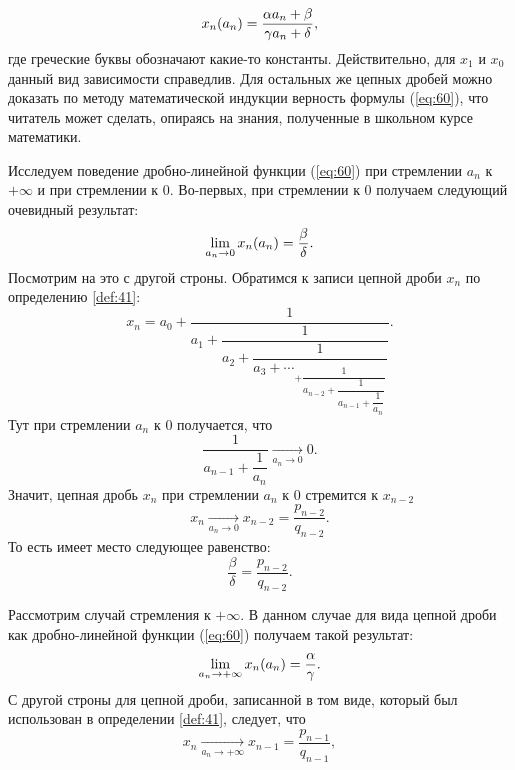 \documentclass[12pt]{article}
\begin{document}
\begin{equation}\label{eq:60}
    x_n\qty(a_n) = \dfrac{\alpha a_n + \beta}{\gamma a_n + \delta},
\end{equation}
где греческие буквы обозначают какие\--то константы. Действительно, для $x_1$ и $x_0$ данный вид зависимости справедлив. Для остальных же цепных дробей можно доказать по методу математической индукции верность формулы (\ref{eq:60}), что читатель может сделать, опираясь на знания, полученные в школьном курсе математики.
\par
Исследуем поведение дробно\--линейной функции (\ref{eq:60}) при стремлении $a_n$ к $+\infty$ и при стремлении к $0$. Во\--первых, при стремлении к $0$ получаем следующий очевидный результат:
\begin{equation}
    \lim_{a_n \rightarrow 0}{x_n\qty(a_n)} = \dfrac{\beta}{\delta}.
\end{equation}
Посмотрим на это с другой строны. Обратимся к записи цепной дроби $x_n$ по определению \ref{def:41}:
\begin{equation}
    x_n = a_0 + \dfrac{1}{a_1 + \dfrac{1}{a_2+ \dfrac{1}{a_3 + \cdots_{+\dfrac{1}{a_{n-2} +\dfrac{1}{a_{n-1} + \dfrac{1}{a_n}}}}}}}.
\end{equation}
Тут при стремлении $a_n$ к $0$ получается, что 
\begin{equation}
    \dfrac{1}{a_{n-1}+\dfrac{1}{a_n}}\underset{a_n\rightarrow0}{\longrightarrow}0.
\end{equation}
Значит, цепная дробь $x_n$ при стремлении $a_n$ к $0$ стремится к $x_{n-2}$
\begin{equation}
    x_n \underset{a_n\rightarrow0}{\longrightarrow} x_{n-2} = \dfrac{p_{n-2}}{q_{n-2}}.
\end{equation}
То есть имеет место следующее равенство:
\begin{equation}\label{eq:65}
    \dfrac{\beta}{\delta} = \dfrac{p_{n-2}}{q_{n-2}}.
\end{equation}
\par
Рассмотрим случай стремления к $+\infty$. В данном случае для вида цепной дроби как дробно\--линейной функции (\ref{eq:60}) получаем такой результат:
\begin{equation}
    \lim_{a_n \rightarrow +\infty}{x_n\qty(a_n)} = \dfrac{\alpha}{\gamma}.
\end{equation}
С другой строны для цепной дроби, записанной в том виде, который был использован в определении \ref{def:41}, следует, что
\begin{equation}
    x_n \underset{a_n\rightarrow +\infty}{\longrightarrow} x_{n-1} = \dfrac{p_{n-1}}{q_{n-1}},
\end{equation}
\end{document}
